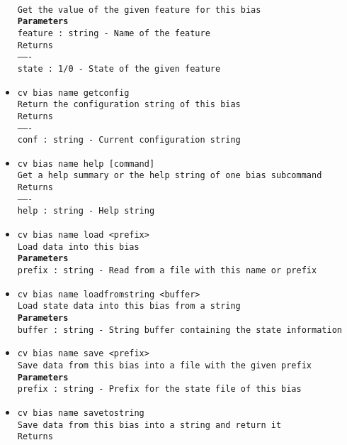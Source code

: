 \begin{itemize}
\\
\texttt{Get the value of the given feature for this bias}
\\
\texttt{\textbf{Parameters}}
\\
\texttt{feature : string - Name of the feature}
\\
\texttt{Returns}
\\
\texttt{-------}
\\
\texttt{state : 1/0 - State of the given feature}
\item \texttt{cv bias name getconfig}
\\
\texttt{Return the configuration string of this bias}
\\
\texttt{Returns}
\\
\texttt{-------}
\\
\texttt{conf : string - Current configuration string}
\item \texttt{cv bias name help [command]}
\\
\texttt{Get a help summary or the help string of one bias subcommand}
\\
\texttt{Returns}
\\
\texttt{-------}
\\
\texttt{help : string - Help string}
\item \texttt{cv bias name load <prefix>}
\\
\texttt{Load data into this bias}
\\
\texttt{\textbf{Parameters}}
\\
\texttt{prefix : string - Read from a file with this name or prefix}
\item \texttt{cv bias name loadfromstring <buffer>}
\\
\texttt{Load state data into this bias from a string}
\\
\texttt{\textbf{Parameters}}
\\
\texttt{buffer : string - String buffer containing the state information}
\item \texttt{cv bias name save <prefix>}
\\
\texttt{Save data from this bias into a file with the given prefix}
\\
\texttt{\textbf{Parameters}}
\\
\texttt{prefix : string - Prefix for the state file of this bias}
\item \texttt{cv bias name savetostring}
\\
\texttt{Save data from this bias into a string and return it}
\\
\texttt{Returns}

\end{itemize}
